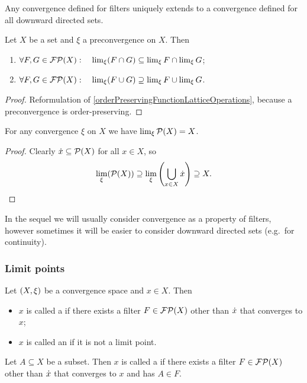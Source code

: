 Any convergence defined for filters uniquely extends to a convergence defined for all downward directed sets. 

\begin{lemma}
Let $X$ be a set and $\xi$ a preconvergence on $X$. Then
\begin{enumerate}
\item $\forall F,G \in \operatorname{\mathcal{FP}}(X): \quad \lim_\xi(F\cap G) \subseteq \lim_\xi F \cap \lim_\xi G$;
\item $\forall F,G \in \operatorname{\mathcal{FP}}(X): \quad \lim_\xi(F\cup G) \supseteq \lim_\xi F \cup \lim_\xi G$.
\end{enumerate}
\end{lemma}
\begin{proof}
Reformulation of \ref{orderPreservingFunctionLatticeOperations}, because a preconvergence is order-preserving.
\end{proof}
\begin{corollary} \label{limitDegenerateFilter}
For any convergence $\xi$ on $X$ we have $\lim_\xi \operatorname{\mathcal{P}}(X) = X$.
\end{corollary}
\begin{proof}
Clearly $\dot{x} \subseteq \operatorname{\mathcal{P}}(X)$ for all $x\in X$, so
\[ \lim_\xi(\operatorname{\mathcal{P}}(X)) \supseteq \lim_\xi \left(\bigcup_{x\in X}\dot{x}\right) \supseteq X. \]
\end{proof}

In the sequel we will usually consider convergence as a property of filters, however sometimes it will be easier to consider downward directed sets (e.g.\ for continuity).

\subsubsection{Limit points}
\begin{definition}
Let $\sSet{X,\xi}$ be a convergence space and $x\in X$. Then
\begin{itemize}
\item $x$ is called a  if there exists a filter $F\in\operatorname{\mathcal{FP}}(X)$ other than $\dot{x}$ that converges to $x$;
\item $x$ is called an  if it is not a limit point.
\end{itemize}
Let $A\subseteq X$ be a subset. Then $x$ is called a  if there exists a filter $F\in\operatorname{\mathcal{FP}}(X)$ other than $\dot{x}$ that converges to $x$ and has $A\in F$.
\end{definition}

